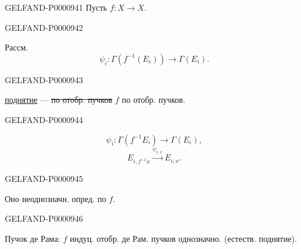 \begin{GelfandAdjacentEvidence}{GELFAND-P000094}{1}
Пусть $f:X\longrightarrow X$.
\end{GelfandAdjacentEvidence}
\begin{GelfandAdjacentEvidence}{GELFAND-P000094}{2}

Рассм.
\begin{equation*}
\psi_i:\Gamma(f^{-1}(E_i))\longrightarrow\Gamma(E_i).
\end{equation*}
\end{GelfandAdjacentEvidence}
\begin{GelfandAdjacentEvidence}{GELFAND-P000094}{3}

\underline{поднятие} — \sout{по отобр. пучков} $f$ по отобр. пучков.
\end{GelfandAdjacentEvidence}
\begin{GelfandAdjacentEvidence}{GELFAND-P000094}{4}

\begin{equation*}
\psi_i:\Gamma(f^{-1}E_i)\longrightarrow\Gamma(E_i),
\end{equation*}
\begin{equation*}
E_{i,f^{-1}x}\overset{\psi_{i,x}}{\longrightarrow}E_{i,x}.
\end{equation*}
\end{GelfandAdjacentEvidence}
\begin{GelfandAdjacentEvidence}{GELFAND-P000094}{5}

Оно неоднозначн. опред. по $f$.
\end{GelfandAdjacentEvidence}
\begin{GelfandAdjacentEvidence}{GELFAND-P000094}{6}

Пучок де Рама: $f$ индуц. отобр. де Рам. пучков однозначно.
(естеств. поднятие).
\end{GelfandAdjacentEvidence}

